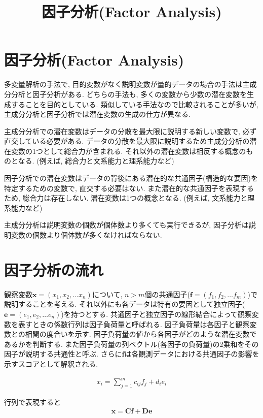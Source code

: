 \documentclass[dvipdfmx, 10pt]{jsarticle}
\title{\textbf{因子分析(Factor Analysis)}}
\author{}
\date{}
\begin{document}
\maketitle

\section*{因子分析(Factor Analysis)}
多変量解析の手法で, 目的変数がなく説明変数が量的データの場合の手法は主成分分析と因子分析がある. 
どちらの手法も, 多くの変数から少数の潜在変数を生成することを目的としている. 類似している手法なので比較されることが多いが, 
主成分分析と因子分析では潜在変数の生成の仕方が異なる. 

主成分分析での潜在変数はデータの分散を最大限に説明する新しい変数で, 
必ず直交している必要がある. データの分散を最大限に説明するため主成分分析の潜在変数の1つとして総合力が含まれる. 
それ以外の潜在変数は相反する概念のものとなる. (例えば, 総合力と文系能力と理系能力など)

因子分析での潜在変数はデータの背後にある潜在的な共通因子(構造的な要因)を特定するための変数で, 直交する必要はない. 
また潜在的な共通因子を表現するため, 総合力は存在しない. 潜在変数は1つの概念となる. (例えば, 文系能力と理系能力など)

主成分分析は説明変数の個数が個体数より多くても実行できるが, 因子分析は説明変数の個数より個体数が多くなければならない. 


\section*{因子分析の流れ}
観察変数\(\mathbf{x} = (x_1, x_2, \dots x_n)\)について, \(n > m\)個の共通因子(\(\mathbf{f} = (f_1, f_2, \dots f_m)\))で説明することを考える. 
それ以外にも各データは特有の要因として独立因子(\(\mathbf{e} = (e_1, e_2, \dots e_n)\))を持つとする. 
共通因子と独立因子の線形結合によって観察変数を表すときの係数行列は因子負荷量と呼ばれる. 
因子負荷量は各因子と観察変数との相関の度合いを示す. 因子負荷量の値から各因子がどのような潜在変数であるかを判断する. 
また因子負荷量の列ベクトル(各因子の負荷量)の2乗和をその因子が説明する共通性と呼ぶ. 
さらに\(\mathbf{f}\)は各観測データにおける共通因子の影響を示すスコアとして解釈される. 

\begin{align*}
    x_i = \sum_{j=1}^{m} c_{ij} f_j + d_i e_i
\end{align*}

行列で表現すると
\begin{align*}
    \mathbf{x} = \mathbf{C} \mathbf{f} + \mathbf{D}\mathbf{e}
\end{align*}
\end{document}
